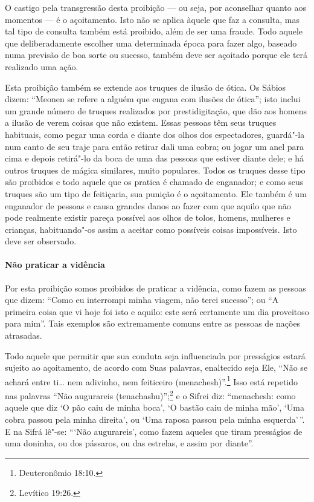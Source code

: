 \begin{multicols}{2}
O castigo pela transgressão desta proibição --- ou seja, por aconselhar
quanto aos momentos --- é o açoitamento. Isto não se aplica àquele que
faz a consulta, mas tal tipo de consulta também está proibido, além de
ser uma fraude. Todo aquele que deliberadamente escolher uma determinada
época para fazer algo, baseado numa previsão de boa sorte ou sucesso,
também deve ser açoitado porque ele terá realizado uma ação.

Esta proibição também se extende aos truques de ilusão de ótica. Os
Sábios dizem: ``Meonen\starr{} se refere a alguém que engana com ilusões de
ótica''; isto inclui um grande número de truques realizados por
prestidigitação, que dão aos homens a ilusão de verem coisas que não
existem. Essas pessoas têm seus truques habituais, como pegar uma corda
e diante dos olhos dos espectadores, guardá"-la num canto de seu traje
para então retirar dali uma cobra; ou jogar um anel para cima e depois
retirá"-lo da boca de uma das pessoas que estiver diante dele; e há
outros truques de mágica similares, muito populares. Todos os truques
desse tipo são proibidos e todo aquele que os pratica é chamado de
enganador; e como seus truques são um tipo de feitiçaria, sua punição é
o açoitamento. Ele também é um enganador de pessoas e causa grandes
danos ao fazer com que aquilo que não pode realmente existir pareça
possível aos olhos de tolos, homens, mulheres e crianças, habituando"-os assim a
aceitar como possíveis coisas impossíveis. Isto deve ser observado.

\paragraph{Não praticar a vidência}

Por esta proibição somos proibidos de praticar a vidência, como fazem
as pessoas que dizem: ``Como eu interrompi minha viagem, não terei
sucesso''; ou ``A primeira coisa que vi hoje foi isto e aquilo: este
será certamente um dia proveitoso para mim''. Tais exemplos são
extremamente comuns entre as pessoas de nações atrasadas.

Todo aquele que permitir que sua conduta seja influenciada por
presságios estará sujeito ao açoitamento, de acordo com Suas palavras,
enaltecido seja Ele, ``Não se achará entre ti\ldots{} nem adivinho, nem
feiticeiro (menachesh\starr)''.\footnote{Deuteronômio 18:10.} Isso está repetido nas
palavras ``Não augurareis (tenachashu\starr)'';\footnote{Levítico 19:26.} e o Sifrei\starr{}
diz: ``menachesh\starr: como aquele que diz `O pão caiu de minha boca', `O
bastão caiu de minha mão', `Uma cobra passou pela minha direita', ou
`Uma raposa passou pela minha esquerda'\,''. E na Sifrá\starr{} lê"-se: ```Não
augurareis', como fazem aqueles que tiram presságios de uma doninha, ou
dos pássaros, ou das estrelas, e assim por diante''.


\end{multicols}
